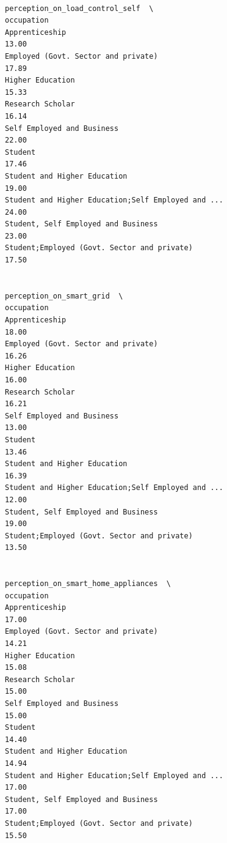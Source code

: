 \documentclass[
  letterpaper,
  DIV=11,
  numbers=noendperiod]{scrartcl}
\begin{document}
\begin{verbatim}
                                                    perception_on_load_control_self  \
occupation                                                                            
Apprenticeship                                                                13.00   
Employed (Govt. Sector and private)                                           17.89   
Higher Education                                                              15.33   
Research Scholar                                                              16.14   
Self Employed and Business                                                    22.00   
Student                                                                       17.46   
Student and Higher Education                                                  19.00   
Student and Higher Education;Self Employed and ...                            24.00   
Student, Self Employed and Business                                           23.00   
Student;Employed (Govt. Sector and private)                                   17.50   

                                                    perception_on_smart_grid  \
occupation                                                                     
Apprenticeship                                                         18.00   
Employed (Govt. Sector and private)                                    16.26   
Higher Education                                                       16.00   
Research Scholar                                                       16.21   
Self Employed and Business                                             13.00   
Student                                                                13.46   
Student and Higher Education                                           16.39   
Student and Higher Education;Self Employed and ...                     12.00   
Student, Self Employed and Business                                    19.00   
Student;Employed (Govt. Sector and private)                            13.50   

                                                    perception_on_smart_home_appliances  \
occupation                                                                                
Apprenticeship                                                                    17.00   
Employed (Govt. Sector and private)                                               14.21   
Higher Education                                                                  15.08   
Research Scholar                                                                  15.00   
Self Employed and Business                                                        15.00   
Student                                                                           14.40   
Student and Higher Education                                                      14.94   
Student and Higher Education;Self Employed and ...                                17.00   
Student, Self Employed and Business                                               17.00   
Student;Employed (Govt. Sector and private)                                       15.50   


\end{verbatim}
\end{document}
